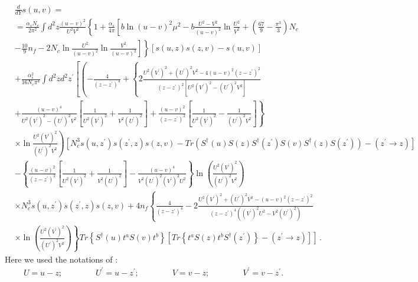 \documentclass[11pt,a4paper]{article}
\begin{document}
\begin{equation}\begin{split}&\frac{d}{dY}s(u,v)=\\
&=\frac{\alpha_{s}N_{c}}{2\pi^{2}}\int d^{2}z\frac{(u-v)^{2}}{U^{2}V^{2}}\left\{ 1+\frac{\alpha_{s}}{4\pi}\left[b\ln(u-v)^{2}\mu^{2}-b\frac{U^{2}-V^{2}}{(u-v)^{2}}\ln\frac{U^{2}}{V^{2}}+
\left(\frac{67}{9}-\frac{\pi^{3}}{3}\right)N_{c}\right.\right.\\
&\left.\left.-\frac{10}{9}n_{f}-2N_{c}\ln\frac{U^{2}}{(u-v)^{2}}\ln\frac{V^{2}}{(u-v)^{2}}\right]\right\} \left[s(u,z)s(z,v)-s(u,v)\right]\\
&+\frac{\alpha_{s}^{2}}{16N_{c}\pi^{4}}\int d^{2}zd^{2}z^{\prime}\left[\left(-\frac{4}{(z-z^{\prime})^{4}}+\left\{ 2\frac{U^{2}(V^{\prime})^{2}+(U^{\prime})^{2}V^{2}-4(u-v)^{2}(z-z^{\prime})^{2}}{(z-z^{\prime})^{2}\left[U^{2}(V^{\prime})^{2}-(U^{\prime})^{2}V^{2}\right]}\right.\right.\right.\\
&\left.\left.+\frac{(u-v)^{4}}{U^{2}(V^{\prime})^{2}-(U^{\prime})^{2}V^{2}}\left[\frac{1}{U^{2}(V^{\prime})^{2}}+\frac{1}{V^{2}(U^{\prime})^{2}}\right]+\frac{(u-v)^{2}}{(z-z^{\prime})^{2}}\left[\frac{1}{U^{2}(V^{\prime})^{2}}-\frac{1}{(U^{\prime})^{2}V^{2}}\right]\right\} \right.  \\ 
&\left. \times  \ln\frac{U^{2}(V^{\prime})^{2}}{(U^{\prime})^{2}V^{2}}\right)
\left[N_{c}^{3}s(u,z^{\prime})s(z^{\prime},z)s(z,v)-Tr\left(S^{\dagger}(u)S(z)S^{\dagger}(z^{\prime})S(v)S^{\dagger}(z)S(z^{\prime})\right)-(z^{\prime}\rightarrow z)\right]\\
&-\left\{ \frac{(u-v)^{2}}{(z-z^{\prime})^{2}}\left[\frac{1}{U^{2}(V^{\prime})^{2}}+\frac{1}{V^{2}(U^{\prime})^{2}}\right]-\frac{(u-v)^{4}}{V^{2}(U^{\prime})^{2}(V^{\prime})^{2}U^{2}}\right\} \ln\left(\frac{U^{2}(V^{\prime})^{2}}{(U^{\prime})^{2}V^{2}}\right)  \\
&\times N_{c}^{3}s(u,z^{\prime})s(z^{\prime},z)s(z,v)
+4n_{f}\left\{ \frac{4}{(z-z^{\prime})^{4}}-2\frac{U^{2}(V^{\prime})^{2}+(U^{\prime})^{2}V^{2}-(u-v)^{2}(z-z^{\prime})^{2}}{(z-z^{\prime})^{4}((V^{\prime})^{2}U^{2}-V^{2}(U^{\prime})^{2})}\right. \\ 
&\left. \times \ln\left(\frac{U^{2}(V^{\prime})^{2}}{(U^{\prime})^{2}V^{2}}\right)\right\} Tr\left\{ S^{\dagger}(u)t^{a}S(v)t^{b}\right\} 
\left.\left[Tr\left\{ t^{a}S(z)t^{b}S^{\dagger}(z^{\prime})\right\} -(z^{\prime}\rightarrow z)\right]\right]\,.
\label{dipole}
\end{split}\end{equation}
Here we used the notations of \cite{BC}:
\begin{equation}\begin{split}
U=u-z;\qquad\qquad U^{\prime}=u-z^{\prime};\qquad\qquad
V=v-z;\qquad\qquad V^{\prime}=v-z^{\prime}.
\end{split}\end{equation} 
\end{document}
